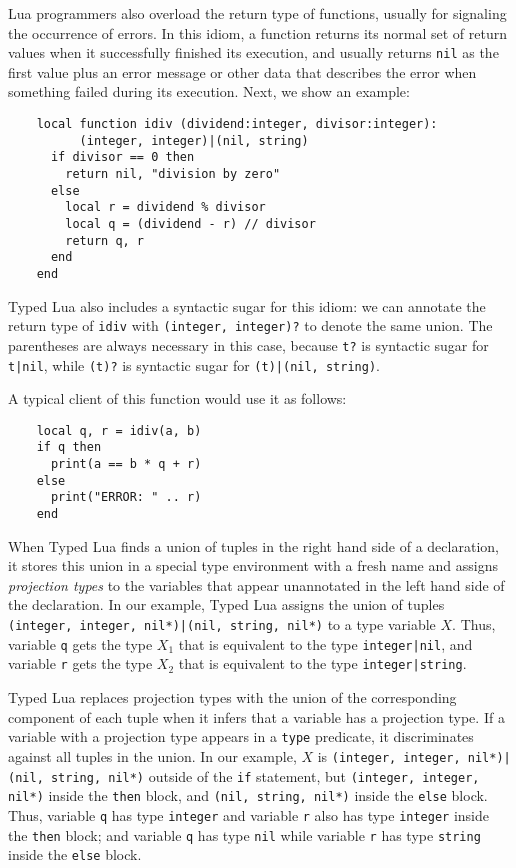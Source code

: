 Lua programmers also overload the return type of functions,
usually for signaling the occurrence of errors.
In this idiom, a function returns its normal set of return values
when it successfully finished its execution,
and usually returns \texttt{nil} as the first value plus an
error message or other data that describes the error
when something failed during its execution.
Next, we show an example:
\begin{verbatim}
    local function idiv (dividend:integer, divisor:integer):
          (integer, integer)|(nil, string)
      if divisor == 0 then
        return nil, "division by zero"
      else
        local r = dividend % divisor
        local q = (dividend - r) // divisor
        return q, r
      end 
    end
\end{verbatim}

Typed Lua also includes a syntactic sugar for this idiom:
we can annotate the return type of \texttt{idiv} with
\texttt{(integer, integer)?} to denote the same union.
The parentheses are always necessary in this case, because
\texttt{t?} is syntactic sugar for \texttt{t|nil},
while \texttt{(t)?} is syntactic sugar for \texttt{(t)|(nil, string)}.

A typical client of this function would use it as follows:
\begin{verbatim}
    local q, r = idiv(a, b)
    if q then
      print(a == b * q + r)
    else
      print("ERROR: " .. r)
    end
\end{verbatim}

When Typed Lua finds a union of tuples in the right hand side of
a declaration, it stores this union in a special type environment
with a fresh name and assigns \emph{projection types} to the
variables that appear unannotated in the left hand side of the declaration.
In our example, Typed Lua assigns the union of tuples
\texttt{(integer, integer, nil*)|(nil, string, nil*)} to a type variable $X$.
Thus, variable \texttt{q} gets the type $X_{1}$
that is equivalent to the type \texttt{integer|nil},
and variable \texttt{r} gets the type $X_{2}$
that is equivalent to the type \texttt{integer|string}.

Typed Lua replaces projection types with the union of the corresponding
component of each tuple when it infers that a variable has a projection type.
If a variable with a projection type appears in a \texttt{type} predicate,
it discriminates against all tuples in the union.
In our example, $X$ is \texttt{(integer, integer, nil*)|(nil, string, nil*)}
outside of the \texttt{if} statement,
but \texttt{(integer, integer, nil*)} inside the \texttt{then} block,
and \texttt{(nil, string, nil*)} inside the \texttt{else} block.
Thus, variable \texttt{q} has type \texttt{integer} and variable \texttt{r} also
has type \texttt{integer} inside the \texttt{then} block;
and variable \texttt{q} has type \texttt{nil} while variable \texttt{r}
has type \texttt{string} inside the \texttt{else} block.

